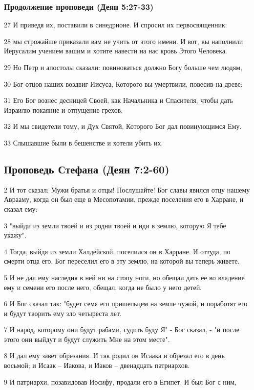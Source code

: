 \subsubsection*{Продолжение проповеди (Деян 5:27-33)}
27 И приведя их, поставили в синедрионе. И спросил их первосвященник:

28 мы строжайше приказали вам не учить от этого имени. И вот, вы наполнили Иерусалим учением вашим и хотите навести на нас кровь Этого Человека.

29 Но Петр и апостолы сказали: повиноваться должно Богу больше чем людям,

30 Бог отцов наших воздвиг Иисуса, Которого вы умертвили, повесив на древе:

31 Его Бог вознес десницей Своей, как Начальника и Спасителя, чтобы дать Израилю покаяние и отпущение грехов.

32 И мы свидетели тому, и Дух Святой, Которого Бог дал повинующимся Ему.

33 Слышавшие были в бешенстве и хотели убить их.

\subsection*{Проповедь Стефана (Деян 7:2-60)}
2 И тот сказал: Мужи братья и отцы! Послушайте! Бог славы явился отцу нашему Аврааму, когда он был еще в Месопотамии, прежде поселения его в Харране, и сказал ему:

3 "выйди из земли твоей и из родни твоей и иди в землю, которую Я тебе укажу".

4 Тогда, выйдя из земли Халдейской, поселился он в Харране. И оттуда, по смерти отца его, Бог переселил его в эту землю, на которой вы теперь живете.

5 И не дал ему наследия в ней ни на стопу ноги, но обещал дать ее во владение ему и семени его после него, обещал, когда не было у него детей.

6 И Бог сказал так: "будет семя его пришельцем на земле чужой, и поработят его и будут творить ему зло четыреста лет.

7 И народ, которому они будут рабами, судить буду Я" - Бог сказал, - "и после этого они выйдут и будут служить Мне на этом месте".

8 И дал ему завет обрезания. И так родил он Исаака и обрезал его в день восьмой; и Исаак – Иакова, и Иаков – двенадцать патриархов.

9 И патриархи, позавидовав Иосифу, продали его в Египет. И был Бог с ним,

